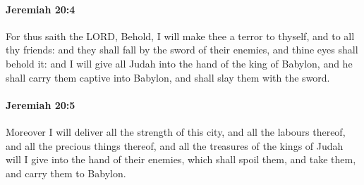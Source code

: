 		\paragraph{Jeremiah 20:4} %
			\label{JEREMIAH-20-4}

			For thus saith the LORD, Behold, I will make thee a terror to thyself, and to all thy friends: and they shall fall by the sword of their enemies, and thine eyes shall behold it: and I will give all Judah into the hand of the king of Babylon, and he shall carry them captive into Babylon, and shall slay them with the sword.


		\paragraph{Jeremiah 20:5} %
			\label{JEREMIAH-20-5}

			Moreover I will deliver all the strength of this city, and all the labours thereof, and all the precious things thereof, and all the treasures of the kings of Judah will I give into the hand of their enemies, which shall spoil them, and take them, and carry them to Babylon.

